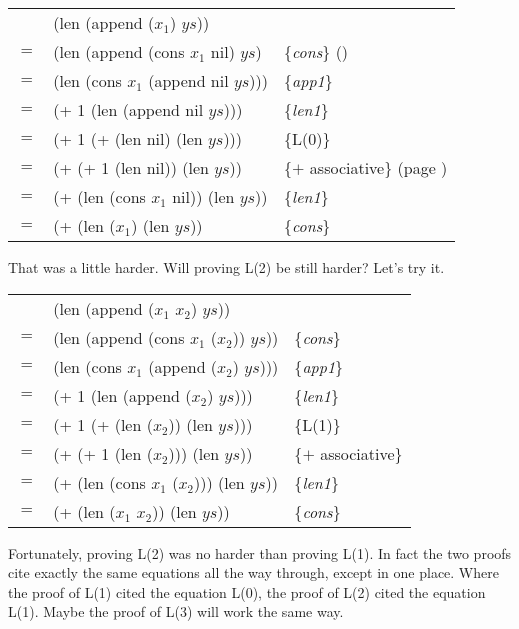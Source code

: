 \begin{center}
\begin{tabular}{lll}
    & (len (append ($x_1$) $ys$))           &                     \\
$=$ & (len (append (cons $x_1$ nil) $ys$)   & \{\emph{cons}\} (\pageref{first-rest-cons}) \\
$=$ & (len (cons $x_1$ (append nil $ys$)))  & \{\emph{app1}\}     \\
$=$ & (+ 1 (len (append nil $ys$)))         & \{\emph{len1}\}     \\
$=$ & (+ 1 (+ (len nil) (len $ys$)))        & \{L(0)\}            \\
$=$ & (+ (+ 1 (len nil)) (len $ys$))        & \{$+$ associative\} (page \pageref{fig-02-01}) \\
$=$ & (+ (len (cons $x_1$ nil)) (len $ys$)) & \{\emph{len1}\}     \\
$=$ & (+ (len ($x_1$) (len $ys$))           & \{\emph{cons}\}     \\
\end{tabular}
\end{center}

That was a little harder. Will proving L(2) be still harder? Let's try it.

\begin{center}
\begin{tabular}{lll}
    & (len (append ($x_1$ $x_2$) $ys$))         &                     \\
$=$ & (len (append (cons $x_1$ ($x_2$)) $ys$))  & \{\emph{cons}\}     \\
$=$ & (len (cons $x_1$ (append ($x_2$) $ys$)))  & \{\emph{app1}\}     \\
$=$ & (+ 1 (len (append ($x_2$) $ys$)))         & \{\emph{len1}\}     \\
$=$ & (+ 1 (+ (len ($x_2$)) (len $ys$)))        & \{L(1)\}            \\
$=$ & (+ (+ 1 (len ($x_2$))) (len $ys$))        & \{$+$ associative\} \\
$=$ & (+ (len (cons $x_1$ ($x_2$))) (len $ys$)) & \{\emph{len1}\}     \\
$=$ & (+ (len ($x_1$ $x_2$)) (len $ys$))        & \{\emph{cons}\}     \\
\end{tabular}
\end{center}

Fortunately, proving L(2) was no harder than proving L(1). 
In fact the two proofs cite exactly the same equations all the way through, 
except in one place. 
Where the proof of L(1) cited the equation L(0), 
the proof of L(2) cited the equation L(1). 
Maybe the proof of L(3) will work the same way.

